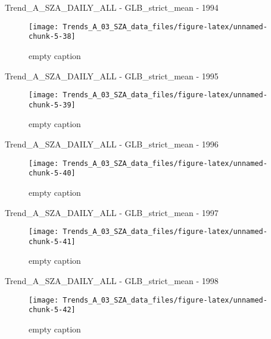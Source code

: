 \documentclass[
  10pt,
  a4paper,oneside]{article}
\begin{document}
Trend\_A\_SZA\_DAILY\_ALL - GLB\_strict\_mean - 1994

\begin{figure}[!ht]

{\centering \texttt{[image: Trends\_A\_03\_SZA\_data\_files/figure-latex/unnamed-chunk-5-38]} 

}

\caption{ empty caption }\label{fig:unnamed-chunk-5-38}
\end{figure}

Trend\_A\_SZA\_DAILY\_ALL - GLB\_strict\_mean - 1995

\begin{figure}[!ht]

{\centering \texttt{[image: Trends\_A\_03\_SZA\_data\_files/figure-latex/unnamed-chunk-5-39]} 

}

\caption{ empty caption }\label{fig:unnamed-chunk-5-39}
\end{figure}

Trend\_A\_SZA\_DAILY\_ALL - GLB\_strict\_mean - 1996

\begin{figure}[!ht]

{\centering \texttt{[image: Trends\_A\_03\_SZA\_data\_files/figure-latex/unnamed-chunk-5-40]} 

}

\caption{ empty caption }\label{fig:unnamed-chunk-5-40}
\end{figure}

Trend\_A\_SZA\_DAILY\_ALL - GLB\_strict\_mean - 1997

\begin{figure}[!ht]

{\centering \texttt{[image: Trends\_A\_03\_SZA\_data\_files/figure-latex/unnamed-chunk-5-41]} 

}

\caption{ empty caption }\label{fig:unnamed-chunk-5-41}
\end{figure}

Trend\_A\_SZA\_DAILY\_ALL - GLB\_strict\_mean - 1998

\begin{figure}[!ht]

{\centering \texttt{[image: Trends\_A\_03\_SZA\_data\_files/figure-latex/unnamed-chunk-5-42]} 

}

\caption{ empty caption }\label{fig:unnamed-chunk-5-42}
\end{figure}
\end{document}
